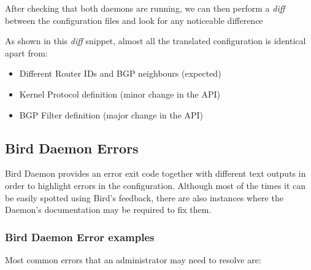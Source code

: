 After checking that both daemons are running, we can then perform a \textit{diff} between the configuration files and look for any noticeable difference



As shown in this \textit{diff} snippet, almost all the translated configuration is identical apart from:

\begin{itemize}
\item Different Router IDs and BGP neighbours (expected)
\item Kernel Protocol definition (minor change in the API)
\item BGP Filter definition (major change in the API)
\end{itemize}

\subsection{Bird Daemon Errors}
Bird Daemon provides an error exit code together with different text outputs in order to highlight errors in the configuration. Although most of the times it can be easily spotted using Bird's feedback, there are also instances where the Daemon's documentation may be required to fix them.

\subsubsection{Bird Daemon Error examples}
Most common errors that an administrator may need to resolve are:

